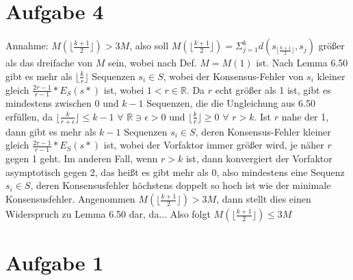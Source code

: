 \documentclass[a4paper,10pt,oneside,reqno]{scrartcl}
\begin{document}
\section*{Aufgabe 4}%
Annahme: $M(\lfloor \frac{k+1}{2}\rfloor) > 3M$, also soll 
$M(\lfloor \frac{k+1}{2}\rfloor) = \Sigma_{j=1}^k d(s_{\lfloor \frac{k+1}{2}\rfloor}, s_j)$ größer als
das dreifache von $M$ sein, wobei nach Def. $M = M(1)$ ist.
Nach Lemma 6.50 gibt es mehr als $\lfloor \frac{k}{r}\rfloor$ Sequenzen $s_i \in S$, wobei der Konsensus-Fehler von $s_i$ kleiner gleich
$\frac{2r-1}{r-1}*E_S(s*)$ ist, wobei $1<r \in \mathbb{R}$. Da $r$ echt größer als 1 ist, gibt es mindestens zwischen 0 und $k-1$ Sequenzen,
die die Ungleichung aus 6.50 erfüllen, da $\lfloor \frac{k}{r+\epsilon}\rfloor \leq k-1$  $\forall$  $\mathbb{R} \ni \epsilon > 0$ und
$\lfloor \frac{k}{r}\rfloor \geq 0$ $\forall$ $r>k$.\newline
Ist $r$ nahe der 1, dann gibt es mehr als $k-1$ Sequenzen $s_i \in S$, deren Konsensus-Fehler kleiner gleich $\frac{2r-1}{r-1}*E_S(s*)$ ist,
wobei der Vorfaktor immer größer wird, je näher $r$ gegen 1 geht. Im anderen Fall, wenn $r>k$ ist, dann konvergiert der Vorfaktor
asymptotisch gegen 2, das heißt es gibt mehr als 0, also mindestens eine Sequenz $s_i \in S$, deren Konsensusfehler höchstens doppelt so hoch
ist wie der minimale Konsensusfehler.\newline
Angenommen $M(\lfloor \frac{k+1}{2}\rfloor) > 3M$, dann stellt dies einen Widerspruch zu Lemma 6.50 dar, da...\newline
Also folgt $M(\lfloor \frac{k+1}{2}\rfloor) \leq 3M$

\section*{Aufgabe 1}%





 
\end{document}
